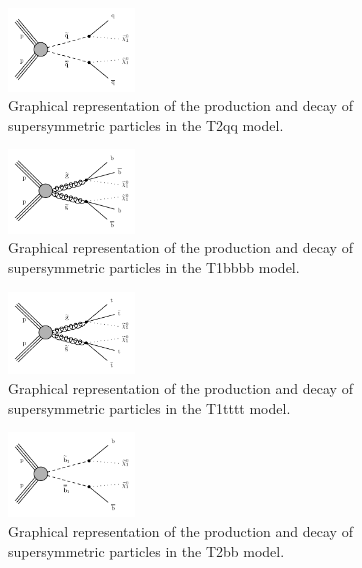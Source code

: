 \begin{figure} \begin{center}
    \includegraphics[width=0.3\textwidth]{Supplementary/T2qq_feyn_aux}
        \caption{
            Graphical representation of the production and decay of
            supersymmetric particles in the T2qq model.
        }
        \label{fig:simplified-models-feyn-light}
\end{center} \end{figure}

\begin{figure}[h!] \begin{center}
    \includegraphics[width=0.3\textwidth]{Supplementary/T1bbbb_feyn_aux}
        \caption{
            Graphical representation of the production and decay of
            supersymmetric particles in the T1bbbb model.
        }
        \label{fig:simplified-models-feyn-gluino}
\end{center} \end{figure}

\begin{figure}[h!] \begin{center}
    \includegraphics[width=0.3\textwidth]{Supplementary/T1tttt_feyn_aux}
        \caption{
            Graphical representation of the production and decay of
            supersymmetric particles in the T1tttt model.
        }
        \label{fig:simplified-models-feyn-gluino}
\end{center} \end{figure}

\begin{figure}[h!] \begin{center}
    \includegraphics[width=0.3\textwidth]{Supplementary/T2bb_feyn_aux}
        \caption{
            Graphical representation of the production and decay of
            supersymmetric particles in the T2bb model.
        }
        \label{fig:simplified-models-feyn-3rdGen}
\end{center} \end{figure}

